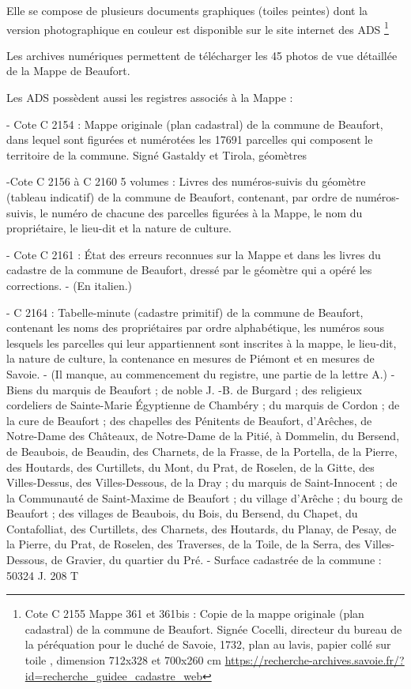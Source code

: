 \documentclass[12pt,a4paper]{report}
\begin{document}
Elle se compose de plusieurs documents graphiques (toiles peintes) dont la version photographique en couleur est disponible sur le site internet des ADS \footnote{Cote C 2155 Mappe 361 et 361bis : Copie de la mappe originale (plan cadastral) de la commune de Beaufort. Signée Cocelli, directeur du bureau de la péréquation pour le duché de Savoie, 1732, plan au lavis, papier collé sur toile , dimension 712x328 et 700x260 cm \url{https://recherche-archives.savoie.fr/?id=recherche_guidee_cadastre_web}}

Les archives numériques permettent de télécharger les 45 photos de vue détaillée de la Mappe de Beaufort.

Les ADS possèdent aussi les registres associés à la Mappe : 

- Cote C 2154 : Mappe originale (plan cadastral) de la commune de Beaufort, dans lequel sont figurées et numérotées les 17691 parcelles qui composent le territoire de la commune. Signé Gastaldy et Tirola, géomètres

-Cote C 2156 à C 2160 5 volumes : Livres des numéros-suivis du géomètre (tableau indicatif) de la commune de Beaufort, contenant, par ordre de numéros-suivis, le numéro de chacune des parcelles figurées à la Mappe, le nom du propriétaire, le lieu-dit et la nature de culture. 

- Cote C 2161 : État des erreurs reconnues sur la Mappe et dans les livres du cadastre de la commune de Beaufort, dressé par le géomètre qui a opéré les corrections. - (En italien.)

- C 2164 : Tabelle-minute (cadastre primitif) de la commune de Beaufort, contenant les noms des propriétaires par ordre alphabétique, les numéros sous lesquels les parcelles qui leur appartiennent sont inscrites à la mappe, le lieu-dit, la nature de culture, la contenance en mesures de Piémont et en mesures de Savoie. - (Il manque, au commencement du registre, une partie de la lettre A.) - Biens du marquis de Beaufort ; de noble J. -B. de Burgard ; des religieux cordeliers de Sainte-Marie Égyptienne de Chambéry ; du marquis de Cordon ; de la cure de Beaufort ; des chapelles des Pénitents de Beaufort, d’Arêches, de Notre-Dame des Châteaux, de Notre-Dame de la Pitié, à Dommelin, du Bersend, de Beaubois, de Beaudin, des Charnets, de la Frasse, de la Portella, de la Pierre, des Houtards, des Curtillets, du Mont, du Prat, de Roselen, de la Gitte, des Villes-Dessus, des Villes-Dessous, de la Dray ; du marquis de Saint-Innocent ; de la Communauté de Saint-Maxime de Beaufort ; du village d’Arêche ; du bourg de Beaufort ; des villages de Beaubois, du Bois, du Bersend, du Chapet, du Contafolliat, des Curtillets, des Charnets, des Houtards, du Planay, de Pesay, de la Pierre, du Prat, de Roselen, des Traverses, de la Toile, de la Serra, des Villes-Dessous, de Gravier, du quartier du Pré. - Surface cadastrée de la commune : 50324 J. 208 T
\end{document}
